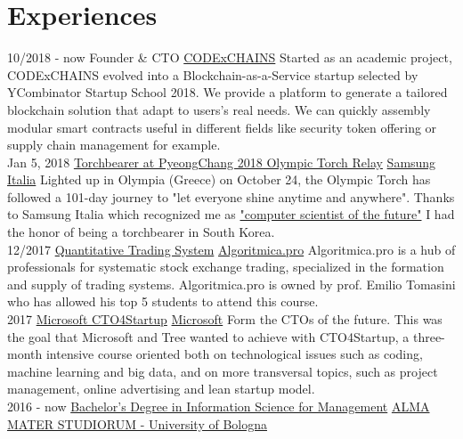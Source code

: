 \documentclass[]{friggeri-cv}
\begin{document}
\section{Experiences}
\begin{entrylist}
    \entry
    {10/2018 - now}
    {Founder \& CTO}
    { \href{http://www.codexchains.com/}{CODExCHAINS}}
    {Started as an academic project, CODExCHAINS evolved into a Blockchain-as-a-Service startup selected by YCombinator Startup School 2018. We provide a platform to generate a tailored blockchain solution that adapt to users's real needs. We can quickly assembly modular smart contracts useful in different fields like security token offering or supply chain management for example.  \\}
    \entry
    {Jan 5, 2018}
    {\href{https://www.pyeongchang2018.com/en/torch-relay/index}{Torchbearer at PyeongChang 2018 Olympic Torch Relay}}
    { \href{http://www.samsung.com/it/}{Samsung Italia}}
    {Lighted up in Olympia (Greece) on October 24, the Olympic Torch has followed a 101-day journey to "let everyone shine anytime and anywhere". Thanks to Samsung Italia which recognized me as \href{http://www.samsung.com/it/diventatedoforo/}{"computer scientist of the future"} I had the honor of being a torchbearer in South Korea.\\}
    \entry
    {12/2017}
    {\href{http://www.algoritmica.pro/corsi-trading-systems/}{Quantitative Trading System}}
    {\href{http://www.algoritmica.pro/}{Algoritmica.pro}}
    {Algoritmica.pro is a hub of professionals for systematic stock exchange trading, specialized in the formation and supply of trading systems. 
    Algoritmica.pro is owned by prof. Emilio Tomasini who has allowed his top 5 students to attend this course.\\}
    \entry
    {2017}
    {\href{https://www.facebook.com/CTO4Startup/}{Microsoft CTO4Startup}}
    {\href{https://www.microsoft.com}{Microsoft}}
    {Form the CTOs of the future. This was the goal that Microsoft and Tree wanted to achieve with CTO4Startup, a three-month intensive course oriented both on technological issues such as coding, machine learning and big data, and on more transversal topics, such as project management, online advertising and lean startup model.
    \\}
    \entry
    {2016 - now}
    {\href{http://www.unibo.it/en/teaching/degree-programmes/programme/2016/8014}{Bachelor's Degree in Information Science for Management}}
    {\href{http://www.unibo.it/en/homepage}{ALMA MATER STUDIORUM - University of Bologna}}

\end{entrylist}
\end{document}
